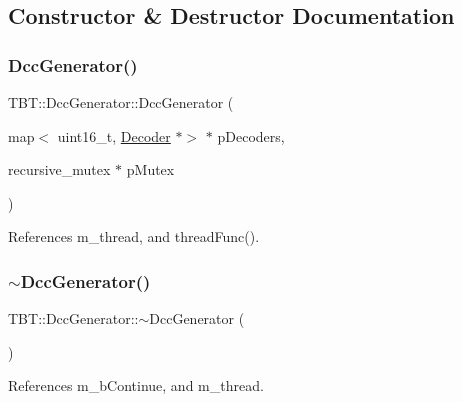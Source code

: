 \subsection{Constructor \& Destructor Documentation}
\mbox{\label{classTBT_1_1DccGenerator_a42d23cfab6b78610d329f816ebfea5cf_a42d23cfab6b78610d329f816ebfea5cf}} 
\subsubsection{\texorpdfstring{Dcc\+Generator()}{DccGenerator()}}
{\footnotesize\ttfamily T\+B\+T\+::\+Dcc\+Generator\+::\+Dcc\+Generator (\begin{DoxyParamCaption}\item[{map$<$ uint16\+\_\+t, \hyperlink{classTBT_1_1Decoder}{Decoder} $\ast$$>$ $\ast$}]{p\+Decoders,  }\item[{recursive\+\_\+mutex $\ast$}]{p\+Mutex }\end{DoxyParamCaption})}



References m\+\_\+thread, and thread\+Func().

\mbox{\label{classTBT_1_1DccGenerator_afa84988600a4dbade4c76366131526dc_afa84988600a4dbade4c76366131526dc}} 
\subsubsection{\texorpdfstring{$\sim$\+Dcc\+Generator()}{~DccGenerator()}}
{\footnotesize\ttfamily T\+B\+T\+::\+Dcc\+Generator\+::$\sim$\+Dcc\+Generator (\begin{DoxyParamCaption}{ }\end{DoxyParamCaption})\hspace{0.3cm}{\ttfamily [virtual]}}



References m\+\_\+b\+Continue, and m\+\_\+thread.



